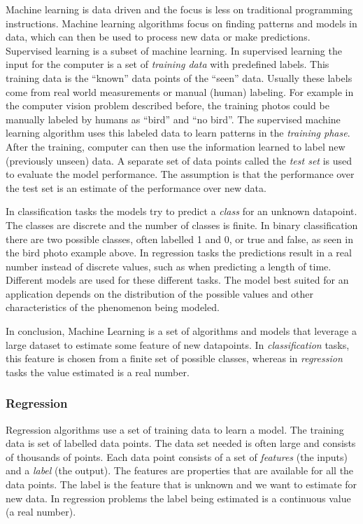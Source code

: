 Machine learning is data driven and the focus is less on traditional programming instructions.
Machine learning algorithms focus on finding patterns and models in data,
which can then be used to process new data or make predictions.
Supervised learning is a subset of machine learning. 
In supervised learning the input for the computer is a set of \textit{training data} with predefined labels. 
This training data is the ``known'' data points of the ``seen'' data.
Usually these labels come from real world measurements or manual (human) labeling.
For example in the computer vision problem described before, the training photos could be manually labeled by humans as ``bird'' and ``no bird''.
The supervised machine learning algorithm uses this labeled data to learn patterns in the \emph{training phase}. After the training, computer can then use the information learned to label new (previously unseen) data.
A separate set of data points called the \emph{test set} is used to evaluate the model performance.
The assumption is that the performance over the test set is an estimate of the performance over new data.

In classification tasks the models try to predict a \emph{class} for an unknown datapoint. The classes are discrete and the number of classes is finite. In binary classification there are two possible classes, often labelled 1 and 0, or true and false, as seen in the bird photo example above. In regression tasks the predictions result in a real number instead of discrete values, such as when predicting a length of time.
Different models are used for these different tasks.
The model best suited for an application depends on the distribution of the possible values and other characteristics of the phenomenon being modeled.

In conclusion, Machine Learning is a set of algorithms and models that leverage a large dataset to estimate some feature of new datapoints.
In \textit{classification} tasks, this feature is chosen from a finite set of possible classes, whereas in \textit{regression} tasks the value estimated is a real number.

\subsubsection{Regression}

Regression algorithms use a set of training data to learn a model.
The training data is set of labelled data points.
The data set needed is often large and consists of thousands of points.
Each data point consists of a set of \emph{features} (the inputs) and a \emph{label} (the output).
The features are properties that are available for all the data points.
The label is the feature that is unknown and we want to estimate for new data.
In regression problems the label being estimated is a continuous value (a real number).

